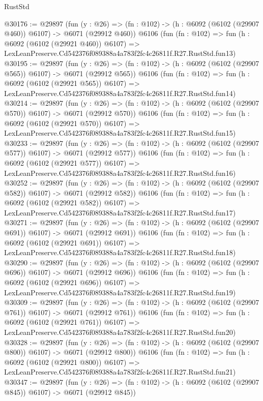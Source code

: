 \begin{lexlean}{RustStd}
\begin{coremodule}
@30176 := @29897
    (fun (y : @26) => (fn : @102) -> (h : @6092 (@6102 (@29907 @460)) @6107) -> @6071 (@29912 @460))
    @6106
    (fun (fn : @102) =>
    fun (h : @6092 (@6102 (@29921 @460)) @6107) =>
    LexLeanPreserve.Cd542376f089388a4a783f2fc4c26811f.R27.RustStd.fun13)
@30195 := @29897
    (fun (y : @26) => (fn : @102) -> (h : @6092 (@6102 (@29907 @565)) @6107) -> @6071 (@29912 @565))
    @6106
    (fun (fn : @102) =>
    fun (h : @6092 (@6102 (@29921 @565)) @6107) =>
    LexLeanPreserve.Cd542376f089388a4a783f2fc4c26811f.R27.RustStd.fun14)
@30214 := @29897
    (fun (y : @26) => (fn : @102) -> (h : @6092 (@6102 (@29907 @570)) @6107) -> @6071 (@29912 @570))
    @6106
    (fun (fn : @102) =>
    fun (h : @6092 (@6102 (@29921 @570)) @6107) =>
    LexLeanPreserve.Cd542376f089388a4a783f2fc4c26811f.R27.RustStd.fun15)
@30233 := @29897
    (fun (y : @26) => (fn : @102) -> (h : @6092 (@6102 (@29907 @577)) @6107) -> @6071 (@29912 @577))
    @6106
    (fun (fn : @102) =>
    fun (h : @6092 (@6102 (@29921 @577)) @6107) =>
    LexLeanPreserve.Cd542376f089388a4a783f2fc4c26811f.R27.RustStd.fun16)
@30252 := @29897
    (fun (y : @26) => (fn : @102) -> (h : @6092 (@6102 (@29907 @582)) @6107) -> @6071 (@29912 @582))
    @6106
    (fun (fn : @102) =>
    fun (h : @6092 (@6102 (@29921 @582)) @6107) =>
    LexLeanPreserve.Cd542376f089388a4a783f2fc4c26811f.R27.RustStd.fun17)
@30271 := @29897
    (fun (y : @26) => (fn : @102) -> (h : @6092 (@6102 (@29907 @691)) @6107) -> @6071 (@29912 @691))
    @6106
    (fun (fn : @102) =>
    fun (h : @6092 (@6102 (@29921 @691)) @6107) =>
    LexLeanPreserve.Cd542376f089388a4a783f2fc4c26811f.R27.RustStd.fun18)
@30290 := @29897
    (fun (y : @26) => (fn : @102) -> (h : @6092 (@6102 (@29907 @696)) @6107) -> @6071 (@29912 @696))
    @6106
    (fun (fn : @102) =>
    fun (h : @6092 (@6102 (@29921 @696)) @6107) =>
    LexLeanPreserve.Cd542376f089388a4a783f2fc4c26811f.R27.RustStd.fun19)
@30309 := @29897
    (fun (y : @26) => (fn : @102) -> (h : @6092 (@6102 (@29907 @761)) @6107) -> @6071 (@29912 @761))
    @6106
    (fun (fn : @102) =>
    fun (h : @6092 (@6102 (@29921 @761)) @6107) =>
    LexLeanPreserve.Cd542376f089388a4a783f2fc4c26811f.R27.RustStd.fun20)
@30328 := @29897
    (fun (y : @26) => (fn : @102) -> (h : @6092 (@6102 (@29907 @800)) @6107) -> @6071 (@29912 @800))
    @6106
    (fun (fn : @102) =>
    fun (h : @6092 (@6102 (@29921 @800)) @6107) =>
    LexLeanPreserve.Cd542376f089388a4a783f2fc4c26811f.R27.RustStd.fun21)
@30347 := @29897
    (fun (y : @26) => (fn : @102) -> (h : @6092 (@6102 (@29907 @845)) @6107) -> @6071 (@29912 @845))

\end{coremodule}
\end{lexlean}
